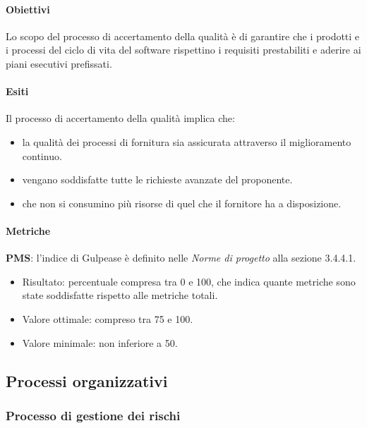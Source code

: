 \documentclass[../piano-di-qualifica.tex]{subfiles}
\begin{document}
\paragraph{Obiettivi}%
\label{par:obiettivi_accertamento_della_qualita}

Lo scopo del processo di accertamento della qualità è di garantire che i prodotti e i processi del ciclo di vita del software rispettino i requisiti prestabiliti e aderire ai piani esecutivi prefissati.

\paragraph{Esiti}%
\label{par:esiti}

Il processo di accertamento della qualità implica che:
\begin{itemize}
  \item la qualità dei processi di fornitura sia assicurata attraverso il miglioramento continuo.
  \item vengano soddisfatte tutte le richieste avanzate del proponente.
  \item che non si consumino più risorse di quel che il fornitore ha a disposizione.
\end{itemize}

\paragraph{Metriche}%
\label{par:metriche_prob}

\textbf{PMS}: l'indice di Gulpease è definito nelle \textit{Norme di progetto} alla sezione 3.4.4.1.
\begin{itemize}
  \item Risultato: percentuale compresa tra 0 e 100, che indica quante metriche sono state soddisfatte rispetto alle metriche totali.
  \item Valore ottimale: compreso tra 75 e 100.
  \item Valore minimale: non inferiore a 50.
\end{itemize}

\subsection{Processi organizzativi}%
\label{sub:processi_organizzativi}

\subsubsection{Processo di gestione dei rischi}%
\label{sub:processo_di_gestione_dei_rischi}
\end{document}
